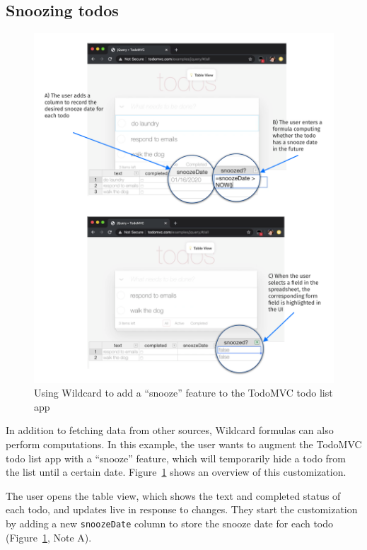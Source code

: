 \documentclass[english,submission]{programming}
\begin{document}
\hypertarget{snoozing-todos}{%
\subsection{Snoozing todos}\label{snoozing-todos}}

\begin{figure}
\hypertarget{fig:todomvc-demo}{%
\centering
\includegraphics{media/todomvc-demo-300dpi.png}
\caption{Using Wildcard to add a ``snooze'' feature to the TodoMVC todo
list app}\label{fig:todomvc-demo}
}
\end{figure}

In addition to fetching data from other sources, Wildcard formulas can
also perform computations. In this example, the user wants to augment
the TodoMVC todo list app with a ``snooze'' feature, which will
temporarily hide a todo from the list until a certain date.{
Figure~\ref{fig:todomvc-demo} shows an overview of this customization.}

The user opens the table view, which shows the text and completed status
of each todo, and updates live in response to changes. They start the
customization by adding a new \texttt{snoozeDate} column to store the
snooze date for each todo{ (Figure~\ref{fig:todomvc-demo}, Note A)}.
\end{document}
